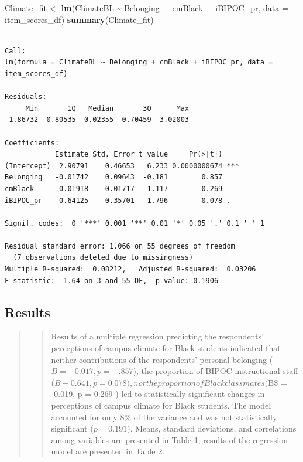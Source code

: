 \documentclass[
  11pt,
]{book}
\newenvironment{Shaded}{\begin{snugshade}}{\end{snugshade}}
\newcommand{\AttributeTok}[1]{\textcolor[rgb]{0.27,0.27,0.27}{#1}}
\newcommand{\FunctionTok}[1]{\textcolor[rgb]{0.27,0.27,0.27}{\textbf{#1}}}
\newcommand{\NormalTok}[1]{#1}
\newcommand{\OtherTok}[1]{\textcolor[rgb]{0.37,0.37,0.37}{#1}}
\newcommand{\SpecialCharTok}[1]{\textcolor[rgb]{0.43,0.43,0.43}{\textbf{#1}}}
\begin{document}
\begin{Shaded}
\begin{Highlighting}[]
\NormalTok{Climate\_fit }\OtherTok{\textless{}{-}} \FunctionTok{lm}\NormalTok{(ClimateBL }\SpecialCharTok{\textasciitilde{}}\NormalTok{ Belonging }\SpecialCharTok{+}\NormalTok{ cmBlack }\SpecialCharTok{+}\NormalTok{ iBIPOC\_pr, }\AttributeTok{data =}\NormalTok{ item\_scores\_df)}
\FunctionTok{summary}\NormalTok{(Climate\_fit)}
\end{Highlighting}
\end{Shaded}

\begin{verbatim}

Call:
lm(formula = ClimateBL ~ Belonging + cmBlack + iBIPOC_pr, data = item_scores_df)

Residuals:
     Min       1Q   Median       3Q      Max 
-1.86732 -0.80535  0.02355  0.70459  3.02003 

Coefficients:
            Estimate Std. Error t value     Pr(>|t|)    
(Intercept)  2.90791    0.46653   6.233 0.0000000674 ***
Belonging   -0.01742    0.09643  -0.181        0.857    
cmBlack     -0.01918    0.01717  -1.117        0.269    
iBIPOC_pr   -0.64125    0.35701  -1.796        0.078 .  
---
Signif. codes:  0 '***' 0.001 '**' 0.01 '*' 0.05 '.' 0.1 ' ' 1

Residual standard error: 1.066 on 55 degrees of freedom
  (7 observations deleted due to missingness)
Multiple R-squared:  0.08212,   Adjusted R-squared:  0.03206 
F-statistic:  1.64 on 3 and 55 DF,  p-value: 0.1906
\end{verbatim}

\hypertarget{results-1}{%
\subsection{Results}\label{results-1}}

\begin{quote}
\begin{quote}
Results of a multiple regression predicting the respondents' perceptions of campus climate for Black students indicated that neither contributions of the respondents' personal belonging (\(B = -0.017, p = -.857\)), the proportion of BIPOC instructional staff (\(B-0.641, p = 0.078), nor the proportion of Black classmates (\)B\$ = -0.019, p = 0.269 ) led to statistically significant changes in perceptions of campus climate for Black students. The model accounted for only 8\% of the variance and was not statistically significant (\(p = 0.191\)). Means, standard deviations, and correlations among variables are presented in Table 1; results of the regression model are presented in Table 2.
\end{quote}
\end{quote}
\end{document}
